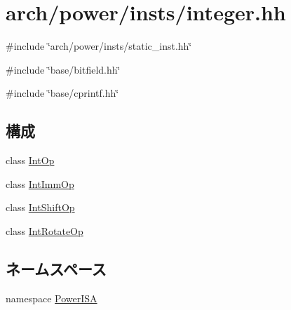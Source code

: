 \hypertarget{integer_8hh}{
\section{arch/power/insts/integer.hh}
\label{integer_8hh}
}
{\ttfamily \#include \char`\"{}arch/power/insts/static\_\-inst.hh\char`\"{}}\par
{\ttfamily \#include \char`\"{}base/bitfield.hh\char`\"{}}\par
{\ttfamily \#include \char`\"{}base/cprintf.hh\char`\"{}}\par
\subsection*{構成}
\begin{DoxyCompactItemize}
\item 
class \hyperlink{classPowerISA_1_1IntOp}{IntOp}
\item 
class \hyperlink{classPowerISA_1_1IntImmOp}{IntImmOp}
\item 
class \hyperlink{classPowerISA_1_1IntShiftOp}{IntShiftOp}
\item 
class \hyperlink{classPowerISA_1_1IntRotateOp}{IntRotateOp}
\end{DoxyCompactItemize}
\subsection*{ネームスペース}
\begin{DoxyCompactItemize}
\item 
namespace \hyperlink{namespacePowerISA}{PowerISA}
\end{DoxyCompactItemize}
